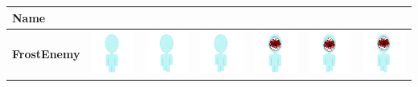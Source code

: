 \documentclass[../Main.tex]{subfiles}
\begin{document}
\begin{center}
                \clearpage
                \begin{tabular}{ | m{} | m{} m{} m{} m{} m{} m{} | }
                    \hline
                    \textbf{Name} & & & & & & \\
                    \hline
                    \multirow{2}{*}{\textbf{FrostEnemy}} & \centerline{\includegraphics[scale=3]{../res/textures/entities/enemies/frost/North.png}} & \centerline{\includegraphics[scale=3]{../res/textures/entities/enemies/frost/North-Walk-1.png}} & \centerline{\includegraphics[scale=3]{../res/textures/entities/enemies/frost/North-Walk-2.png}} & \centerline{\includegraphics[scale=3]{../res/textures/entities/enemies/frost/South.png}} & \centerline{\includegraphics[scale=3]{../res/textures/entities/enemies/frost/South-Walk-1.png}} & \centerline{\includegraphics[scale=3]{../res/textures/entities/enemies/frost/South-Walk-2.png}} \\

\end{tabular}
\end{center}
\end{document}
